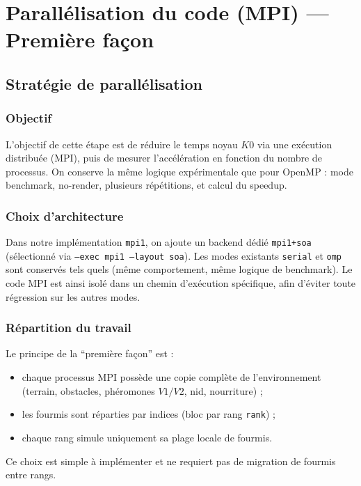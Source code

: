 \section{Parallélisation du code (MPI) --- Première façon}

\subsection{Stratégie de parallélisation}

\subsubsection{Objectif}

L'objectif de cette étape est de réduire le temps noyau \(K0\) via une exécution distribuée
(MPI), puis de mesurer l'accélération en fonction du nombre de processus.
On conserve la même logique expérimentale que pour OpenMP : mode benchmark, no-render,
plusieurs répétitions, et calcul du speedup.

\subsubsection{Choix d'architecture}

Dans notre implémentation \texttt{mpi1}, on ajoute un backend dédié \texttt{mpi1+soa}
(sélectionné via \texttt{--exec mpi1 --layout soa}).
Les modes existants \texttt{serial} et \texttt{omp} sont conservés tels quels
(même comportement, même logique de benchmark). Le code MPI est ainsi isolé dans un chemin
d'exécution spécifique, afin d'éviter toute régression sur les autres modes.

\subsubsection{Répartition du travail}

Le principe de la ``première façon'' est :
\begin{itemize}[leftmargin=*]
  \item chaque processus MPI possède une copie complète de l'environnement
  (terrain, obstacles, phéromones \(V1/V2\), nid, nourriture) ;
  \item les fourmis sont réparties par indices (bloc par rang \texttt{rank}) ;
  \item chaque rang simule uniquement sa plage locale de fourmis.
\end{itemize}

Ce choix est simple à implémenter et ne requiert pas de migration de fourmis entre rangs.


